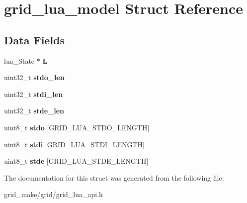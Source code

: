 \hypertarget{structgrid__lua__model}{\section{grid\-\_\-lua\-\_\-model Struct Reference}
\label{structgrid__lua__model}
}
\subsection*{Data Fields}
\begin{DoxyCompactItemize}
\item 
\hypertarget{structgrid__lua__model_a2078f888cd5cd27e9bbc1ee501fa81f6}{lua\-\_\-\-State $\ast$ {\bfseries L}}\label{structgrid__lua__model_a2078f888cd5cd27e9bbc1ee501fa81f6}

\item 
\hypertarget{structgrid__lua__model_a3b4111d2705253f7c2718f80bef9402a}{uint32\-\_\-t {\bfseries stdo\-\_\-len}}\label{structgrid__lua__model_a3b4111d2705253f7c2718f80bef9402a}

\item 
\hypertarget{structgrid__lua__model_a9c6ca835187829d13d7cef56ebce5908}{uint32\-\_\-t {\bfseries stdi\-\_\-len}}\label{structgrid__lua__model_a9c6ca835187829d13d7cef56ebce5908}

\item 
\hypertarget{structgrid__lua__model_a08b08533caafc811fe46ad1c8ba981d4}{uint32\-\_\-t {\bfseries stde\-\_\-len}}\label{structgrid__lua__model_a08b08533caafc811fe46ad1c8ba981d4}

\item 
\hypertarget{structgrid__lua__model_a4da4ff18b3f9288038ac21ec64bf23bf}{uint8\-\_\-t {\bfseries stdo} \mbox{[}G\-R\-I\-D\-\_\-\-L\-U\-A\-\_\-\-S\-T\-D\-O\-\_\-\-L\-E\-N\-G\-T\-H\mbox{]}}\label{structgrid__lua__model_a4da4ff18b3f9288038ac21ec64bf23bf}

\item 
\hypertarget{structgrid__lua__model_a465280539e46f0b9cc7c6c5007d463de}{uint8\-\_\-t {\bfseries stdi} \mbox{[}G\-R\-I\-D\-\_\-\-L\-U\-A\-\_\-\-S\-T\-D\-I\-\_\-\-L\-E\-N\-G\-T\-H\mbox{]}}\label{structgrid__lua__model_a465280539e46f0b9cc7c6c5007d463de}

\item 
\hypertarget{structgrid__lua__model_ad9628e1ef6f3693514f2cb9cc560743d}{uint8\-\_\-t {\bfseries stde} \mbox{[}G\-R\-I\-D\-\_\-\-L\-U\-A\-\_\-\-S\-T\-D\-E\-\_\-\-L\-E\-N\-G\-T\-H\mbox{]}}\label{structgrid__lua__model_ad9628e1ef6f3693514f2cb9cc560743d}

\end{DoxyCompactItemize}


The documentation for this struct was generated from the following file\-:\begin{DoxyCompactItemize}
\item 
grid\-\_\-make/grid/grid\-\_\-lua\-\_\-api.\-h\end{DoxyCompactItemize}
